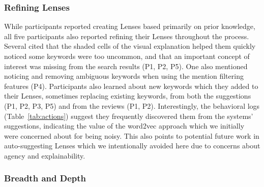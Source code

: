 




\subsubsection{Refining Lenses}

While participants reported creating Lenses based primarily on prior knowledge, all five participants also reported refining their Lenses throughout the process. Several cited that the shaded cells of the visual explanation helped them quickly noticed some keywords were too uncommon, and that an important concept of interest was missing from the search results (P1, P2, P5). One also mentioned noticing and removing ambiguous keywords when using the mention filtering features (P4). Participants also learned about new keywords which they added to their Lenses, sometimes replacing existing keywords, from both the suggestions (P1, P2, P3, P5) and from the reviews (P1, P2). Interestingly, the behavioral logs (Table~\ref{tab:actions}) suggest they frequently discovered them from the systems' suggestions, indicating the value of the word2vec approach which we initially were concerned about for being noisy. This also points to potential future work in auto-suggesting Lenses which we intentionally avoided here due to concerns about agency and explainability. 

\subsubsection{Breadth and Depth}

